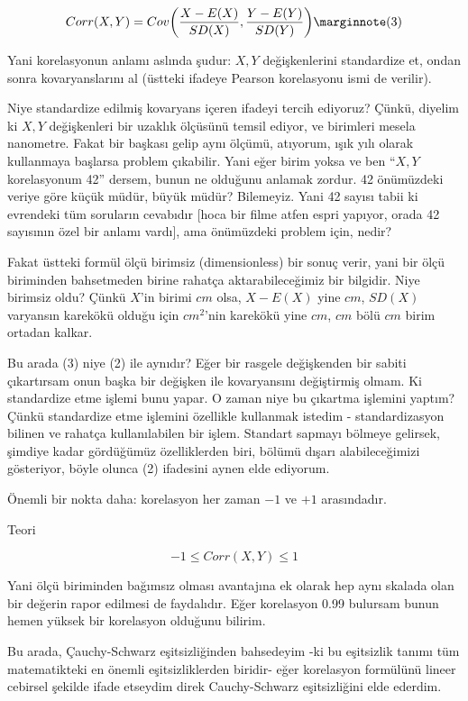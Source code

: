 \documentclass[12pt,fleqn]{article}\usepackage{../../common}
\begin{document}
$$ Corr(X,Y) = Cov \bigg( \frac{X-E(X)}{SD(X)}, \frac{Y-E(Y)}{SD(Y)}
\bigg) 
\mlabel{3}
$$

Yani korelasyonun anlamı aslında şudur: $X,Y$ değişkenlerini standardize
et, ondan sonra kovaryanslarını al (üstteki ifadeye Pearson korelasyonu
ismi de verilir).

Niye standardize edilmiş kovaryans içeren ifadeyi tercih ediyoruz? Çünkü,
diyelim ki $X,Y$ değişkenleri bir uzaklık ölçüsünü temsil ediyor, ve
birimleri mesela nanometre. Fakat bir başkası gelip aynı ölçümü, atıyorum,
ışık yılı olarak kullanmaya başlarsa problem çıkabilir. Yani eğer birim
yoksa ve ben ``$X,Y$ korelasyonum 42'' dersem, bunun ne olduğunu anlamak
zordur. 42 önümüzdeki veriye göre küçük müdür, büyük müdür? Bilemeyiz. Yani
42 sayısı tabii ki evrendeki tüm soruların cevabıdır [hoca bir filme atfen
espri yapıyor, orada 42 sayısının özel bir anlamı vardı], ama önümüzdeki
problem için, nedir?

Fakat üstteki formül ölçü birimsiz (dimensionless) bir sonuç verir, yani
bir ölçü biriminden bahsetmeden birine rahatça aktarabileceğimiz bir
bilgidir. Niye birimsiz oldu? Çünkü $X$'in birimi $cm$ olsa, $X-E(X)$ yine
$cm$, $SD(X)$ varyansın karekökü olduğu için $cm^2$'nin karekökü yine $cm$,
$cm$ bölü $cm$ birim ortadan kalkar.

Bu arada (3) niye (2) ile aynıdır? Eğer bir rasgele değişkenden bir sabiti
çıkartırsam onun başka bir değişken ile kovaryansını değiştirmiş olmam. Ki
standardize etme işlemi bunu yapar. O zaman niye bu çıkartma işlemini
yaptım? Çünkü standardize etme işlemini özellikle kullanmak istedim -
standardizasyon bilinen ve rahatça kullanılabilen bir işlem. Standart
sapmayı bölmeye gelirsek, şimdiye kadar gördüğümüz özelliklerden biri,
bölümü dışarı alabileceğimizi gösteriyor, böyle olunca (2) ifadesini aynen
elde ediyorum. 

Önemli bir nokta daha: korelasyon her zaman $-1$ ve $+1$ arasındadır. 

Teori

$$ -1 \le Corr(X,Y) \le 1 $$

Yani ölçü biriminden bağımsız olması avantajına ek olarak hep aynı skalada
olan bir değerin rapor edilmesi de faydalıdır. Eğer korelasyon 0.99
bulursam bunun hemen yüksek bir korelasyon olduğunu bilirim. 

Bu arada, Çauchy-Schwarz eşitsizliğinden bahsedeyim -ki bu eşitsizlik
tanımı tüm matematikteki en önemli eşitsizliklerden biridir- eğer
korelasyon formülünü lineer cebirsel şekilde ifade etseydim direk
Cauchy-Schwarz eşitsizliğini elde ederdim. 
\end{document}
